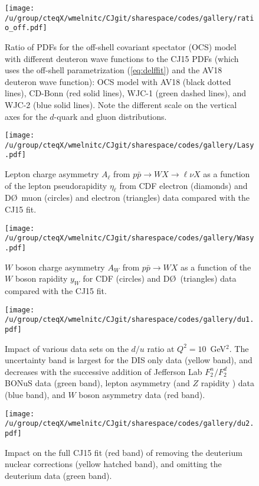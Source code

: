 \documentclass[aps,prd,amsmath,preprint]{revtex4}
\begin{document}
\begin{figure}[t]
\texttt{[image: /u/group/cteqX/wmelnitc/CJgit/sharespace/codes/gallery/ratio\_off.pdf]}
\caption{Ratio of PDFs for the off-shell covariant spectator (OCS)
	model with different deuteron wave functions to the CJ15 PDFs
	(which uses the off-shell parametrization (\ref{eq:delffit})
	and the AV18 deuteron wave function):
	OCS model with AV18 (black dotted lines),
	CD-Bonn (red solid lines),
	WJC-1 (green dashed lines), and
	WJC-2 (blue solid lines).
	Note the different scale on the vertical axes for the
	$d$-quark and gluon distributions.}
\label{fig:ratio_off}
\end{figure} 


\begin{figure}[t]
\texttt{[image: /u/group/cteqX/wmelnitc/CJgit/sharespace/codes/gallery/Lasy.pdf]}
\caption{Lepton charge asymmetry $A_{\ell}$ from
	$p\bar p \to W X \to \ell \nu X$ as a function of the
	lepton pseudorapidity $\eta_{\ell}$ from
	CDF electron (diamonds) \cite{CDF_e} and
	D\O\ muon (circles) \cite{D0_mu} and
	electron (triangles) \cite{D0_e} data
	compared with the CJ15 fit.}
\label{fig:Lasy}
\end{figure} 

  
\begin{figure}[t]
\texttt{[image: /u/group/cteqX/wmelnitc/CJgit/sharespace/codes/gallery/Wasy.pdf]}
\caption{$W$ boson charge asymmetry $A_W$ from $p\bar p \to W X$
	as a function of the $W$ boson rapidity $y_W$ for
	CDF (circles) \cite{CDF_W} and D\O\ (triangles) \cite{D0_W} data
	compared with the CJ15 fit.}
\label{fig:Wasy}
\end{figure} 


\begin{figure}[t]
\texttt{[image: /u/group/cteqX/wmelnitc/CJgit/sharespace/codes/gallery/du1.pdf]}
\caption{Impact of various data sets on the $d/u$ ratio at
	$Q^2=10$~GeV$^2$. The uncertainty band is largest for the
	DIS only data (yellow band), and decreases with the successive
	addition of Jefferson Lab $F_2^n/F_2^d$ BONuS \cite{BONuS} data
	(green band),
	lepton asymmetry \cite{CDF_e, D0_mu, D0_e} (and $Z$ rapidity
	\cite{CDFZ, D0Z}) data (blue band), and
	$W$ boson asymmetry data \cite{CDF_W, D0_W} (red band).}
\label{fig:du1}
\end{figure} 


\begin{figure}[t]
\texttt{[image: /u/group/cteqX/wmelnitc/CJgit/sharespace/codes/gallery/du2.pdf]}
\caption{Impact on the full CJ15 fit (red band) of removing the
	deuterium nuclear corrections (yellow hatched band),
	and omitting the deuterium data (green band).}
\label{fig:du2}
\end{figure} 
\end{document}
